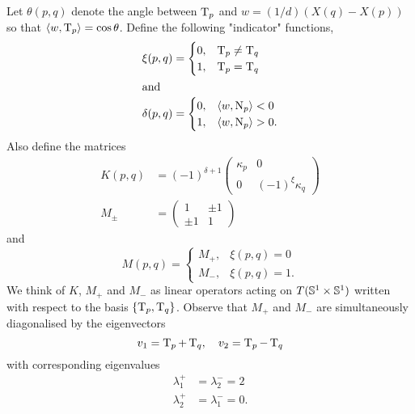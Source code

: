 \documentclass[a4paper, 12pt]{amsart}
\begin{document}
Let $\theta(p,q)$ denote the angle between $\tang_{p}$ and $w = (1/d)(X(q) - X(p))$ so that $\inpr{w}{\tang_p} = \cos\theta$. Define the following "indicator" functions,
\begin{align*}
\xi(p, q) &= \begin{cases}
0,& \tang_{p} \ne \tang_{q} \\
1,& \tang_{p} = \tang_{q}
\end{cases} \\
\intertext{and}
\delta(p, q) &= \begin{cases}
0,& \inpr{w}{\nor_{p}} < 0 \\
1,& \inpr{w}{\nor_{p}} > 0.
\end{cases}
\end{align*}
Also define the matrices
\begin{align*}
K(p,q) &= (-1)^{\delta+1}\begin{pmatrix}
\kappa_{p} & 0 \\
0 & (-1)^{\xi} \kappa_{q}
\end{pmatrix} \\
M_{\pm} &= \begin{pmatrix}
1 & \pm 1 \\
\pm 1 & 1 
\end{pmatrix}
\end{align*}
and
\[
M(p,q) = \begin{cases}
M_+,& \xi(p,q) = 0 \\
M_-,& \xi(p,q) = 1.
\end{cases}
\]
We think of $K$, $M_+$ and $M_-$ as linear operators acting on $T(\S^1\times\S^1)$ written with respect to the basis $\{\tang_p, \tang_q\}$. Observe that $M_+$ and $M_-$ are simultaneously diagonalised by the eigenvectors 
\begin{equation}
\label{eq:eigenvectors}
v_1 = \tang_{p} + \tang_{q}, \quad v_2 = \tang_{p} - \tang_{q}
\end{equation}
with corresponding eigenvalues
\begin{equation}
\label{eq:eigenvalues}
\begin{split}
\lambda^+_1 &= \lambda^-_2 = 2 \\
\lambda^+_2 &= \lambda^-_1 = 0.
\end{split}
\end{equation} 
\end{document}
